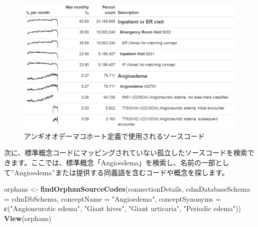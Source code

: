 \documentclass[
  11pt]{book}
\newenvironment{Shaded}{\begin{snugshade}}{\end{snugshade}}
\newcommand{\AttributeTok}[1]{\textcolor[rgb]{0.13,0.29,0.53}{#1}}
\newcommand{\FunctionTok}[1]{\textcolor[rgb]{0.13,0.29,0.53}{\textbf{#1}}}
\newcommand{\NormalTok}[1]{#1}
\newcommand{\OtherTok}[1]{\textcolor[rgb]{0.56,0.35,0.01}{#1}}
\newcommand{\StringTok}[1]{\textcolor[rgb]{0.31,0.60,0.02}{#1}}
\theoremstyle{definition}
\theoremstyle{definition}
\theoremstyle{definition}
\theoremstyle{definition}
\theoremstyle{remark}
\begin{document}
\begin{figure}

{\centering \includegraphics[width=1\linewidth]{images/DataQuality/sourceCodesAngioedema} 

}

\caption{アンギオオデーマコホート定義で使用されるソースコード}\label{fig:sourceCodesAngioedema}
\end{figure}

次に、標準概念コードにマッピングされていない孤立したソースコードを検索できます。ここでは、標準概念「Angioedema」を検索し、名前の一部として''Angioedema''または提供する同義語を含むコードや概念を探します。

\begin{Shaded}
\begin{Highlighting}[]
\NormalTok{orphans }\OtherTok{\textless{}{-}} \FunctionTok{findOrphanSourceCodes}\NormalTok{(connectionDetails,}
                                 \AttributeTok{cdmDatabaseSchema =}\NormalTok{ cdmDbSchema,}
                                 \AttributeTok{conceptName =} \StringTok{"Angioedema"}\NormalTok{,}
                                 \AttributeTok{conceptSynonyms =} \FunctionTok{c}\NormalTok{(}\StringTok{"Angioneurotic edema"}\NormalTok{,}
                                                     \StringTok{"Giant hives"}\NormalTok{,}
                                                     \StringTok{"Giant urticaria"}\NormalTok{,}
                                                     \StringTok{"Periodic edema"}\NormalTok{))}
\FunctionTok{View}\NormalTok{(orphans)}
\end{Highlighting}
\end{Shaded}
\end{document}
